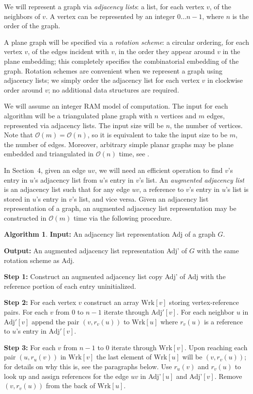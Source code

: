 \documentclass[12pt,letterpaper]{article}
\theoremstyle{plain}
\theoremstyle{definition}
\theoremstyle{break}
\newtheorem{algorithm}[lemma]{Algorithm}     %
\newcommand{\defterm}[1]{\emph{#1}} %
\begin{document}
We will represent a graph via \textit{adjacency lists}:
a list, for each vertex $v$, of the neighbors of $v$.
A vertex can be represented by an integer $0\dots n-1$,
where $n$ is the order of the graph.

A plane graph will be specified via
a \defterm{rotation scheme}:
a circular ordering,
for each vertex $v$, of the edges incident with $v$,
in the order they appear around $v$ in the plane embedding;
this completely specifies
the combinatorial embedding of the graph.
Rotation schemes are convenient when we represent a graph
using adjacency lists;
we simply order the adjacency
list for each vertex $v$ in clockwise order around $v$;
no additional data structures are required.

We will assume an integer RAM model of computation. The input for each algorithm
will be a triangulated plane graph with $n$ vertices and $m$ edges, represented
via adjacency lists. The input size will be $n$, the number of vertices. Note
that $\mathcal{O}(m)=\mathcal{O}(n)$, so it is equivalent to take the input size
to be $m$, the number of edges. Moreover, arbitrary simple planar graphs may be
plane embedded and triangulated in $\mathcal{O}(n)$ time, see
\cite{BoMy2004}.

In Section~4, given an edge $uv$, we will need an efficient operation to
find $v$'s entry in $u$'s adjacency list from $u$'s entry in $v$'s list.
An \defterm{augmented adjacency list} is an adjacency list such that for
any edge $uv$, a reference to $v$'s entry in
$u$'s list is stored in $u$'s entry in $v$'s list, and vice versa. Given an
adjacency list representation of a graph, an augmented
adjacency list representation may be constructed in $\mathcal{O}(m)$ time via
the following procedure.

\begin{algorithm} \label{A:augment}
\textbf{Input:} An adjacency list representation Adj of a graph $G$.

\noindent\textbf{Output:} An augmented adjacency list representation Adj' of $G$
with the same rotation scheme as Adj.

\noindent\textbf{Step 1:} Construct an augmented adjacency list copy Adj' of Adj
with the reference portion of each entry uninitialized.

\noindent\textbf{Step 2:} For each vertex $v$ construct an array $\text{Wrk}[v]$
storing vertex-reference pairs. For each $v$ from $0$ to $n-1$ iterate through
$\text{Adj}'[v]$. For each neighbor $u$ in $\text{Adj}'[v]$ append the pair $(v,r_v(u))$ to
$\text{Wrk}[u]$ where $r_v(u)$ is a reference to $u$'s entry in $\text{Adj}'[v]$.

\noindent\textbf{Step 3:} For each $v$ from $n-1$ to $0$ iterate through
$\text{Wrk}[v]$. Upon reaching each pair $(u,r_u(v))$ in $\text{Wrk}[v]$ the last element of
$\text{Wrk}[u]$ will be $(v,r_v(u))$; for details on why this is, see the paragraphs
below. Use
$r_u(v)$ and $r_v(u)$ to look up and assign references for the edge $uv$ in
Adj'$[u]$ and Adj'$[v]$. Remove $(v,r_v(u))$ from the back of $\text{Wrk}[u]$.
\end{algorithm}
\end{document}
